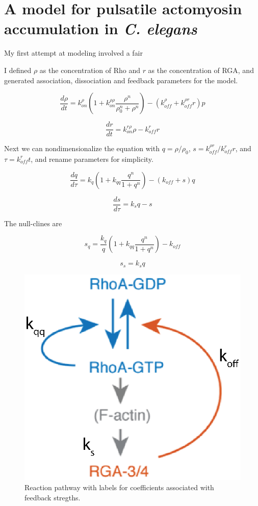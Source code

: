 \section{A model for pulsatile actomyosin accumulation in \textit{C. elegans} }

My first attempt at modeling involved a fair

I defined $\rho$ as the concentration of Rho and $r$ as the concentration of RGA, and generated association, dissociation and feedback parameters for the model. 

\begin{equation}
\label{eqn:rho_1}
	\frac{d\rho}{dt} = k_{on}^\rho \left( 1+k_{on}^{\rho\rho} \frac{\rho^n}{\rho_0^n +\rho^n} \right ) - (k_{off}^\rho + k_{off}^{\rho r} r) p
\end{equation}

\begin{equation}
\label{eqn:rga_1}
	\frac{dr}{dt} = k_{on}^{r \rho}\rho - k_{off}^r r 
\end{equation}

Next we can nondimensionalize the equation with $q=\rho/\rho_0$, $s=k_{off}^{\rho r}/k_{off}^r r$, and $\tau=k_{off}^r t$, and rename parameters for simplicity.

\begin{equation}
	\frac{dq}{d\tau} = k_q \left( 1+k_{qq} \frac{q^n}{1 +q^n} \right ) - (k_{off} + s) q
\end{equation}

\begin{equation}
	\frac{ds}{d\tau} = k_s q - s
\end{equation}

The null-clines are 

\begin{equation}
	s_q =\frac{k_q}{q} \left( 1+k_{qq} \frac{q^n}{1 +q^n} \right ) - k_{off} 
\end{equation}

\begin{equation}
	s_s = k_s q
\end{equation}

\begin{figure}[h!]
\centering
\includegraphics[width=0.5\hsize]{pulse/diagram_eq.eps}
\caption{\label{fig:pulse_diag}  Reaction pathway with labels for coefficients associated with feedback stregths.}
\end{figure}

